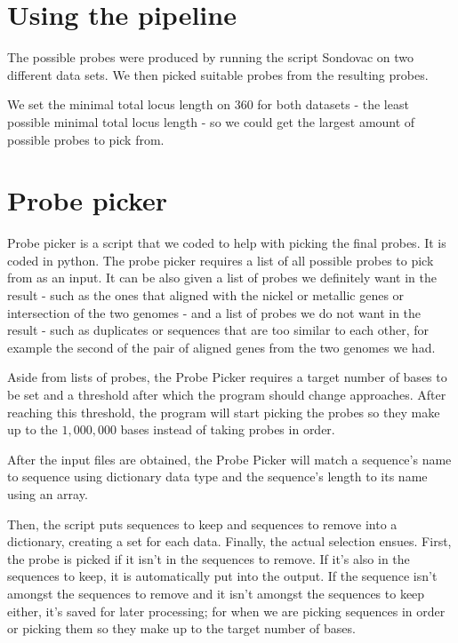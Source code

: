 \section{Using the pipeline}
The possible probes were produced by running the script Sondovac on two different data sets. We then picked suitable probes from 
the resulting probes. 

We set the minimal total locus length on $360$ for both datasets - the least possible minimal total locus length - so we could get 
the largest amount of possible probes to pick from. 



\section{Probe picker}
Probe picker is a script that we coded to help with picking the final probes. It is coded in python. The probe picker requires 
a list of all possible probes to pick from as an input. It can be also given a list of probes we definitely want in the result - such as the 
ones that aligned with the nickel or metallic genes or intersection of the two genomes - and a list of probes we do not want in 
the result - such as duplicates or sequences that are too similar to each other, for 
example the second of the pair of aligned genes from the two genomes we had. 

Aside from lists of probes, the Probe Picker requires a target number of bases to be set and a threshold after which the program should 
change approaches. After reaching this threshold, the program will start picking the probes so they make up to the $1,000,000$ bases instead of 
taking probes in order. 

After the input files are obtained, the Probe Picker will match a sequence's name to sequence using dictionary data type and the sequence's length to 
its name using an array. 

Then, the script puts sequences to keep and sequences to remove into a dictionary, creating a set for each data. 
Finally, the actual selection ensues. 
First, the probe is picked if it isn't in the sequences to remove. If it's also in the sequences to keep, it is automatically put into the output. 
If the sequence isn't amongst the sequences to remove and it isn't amongst the sequences to keep either, it's saved for later processing; for when we are 
picking sequences in order or picking them so they make up to the target number of bases. 

